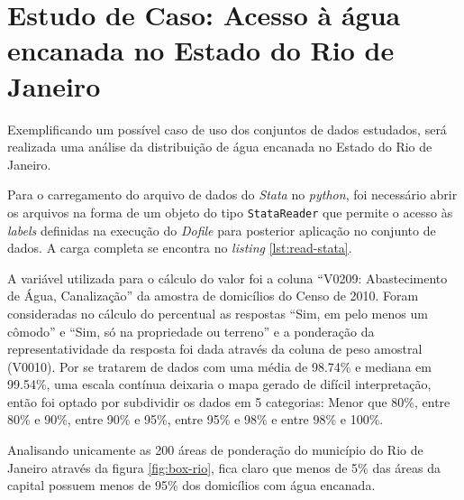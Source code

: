 

\chapter{Estudo de Caso: Acesso à água encanada no Estado do Rio de Janeiro}

    Exemplificando um possível caso de uso dos conjuntos de dados estudados, será realizada uma análise da distribuição de água encanada no Estado do Rio de Janeiro.

    Para o carregamento do arquivo de dados do \textit{Stata} no \textit{python}, foi necessário abrir os arquivos na forma de um objeto do tipo \verb|StataReader| que permite o acesso às \textit{labels} definidas na execução do \textit{Dofile} para posterior aplicação no conjunto de dados. A carga completa se encontra no \textit{listing} \ref{lst:read-stata}. 
    
    A variável utilizada para o cálculo do valor foi a coluna ``V0209: Abastecimento de Água, Canalização'' da amostra de domicílios do Censo de 2010. Foram consideradas no cálculo do percentual as respostas ``Sim, em pelo menos um cômodo'' e ``Sim, só na propriedade ou terreno'' e a ponderação da representatividade da resposta foi dada através da coluna de peso amostral (V0010). Por se tratarem de dados com uma média de 98.74\% e mediana em 99.54\%, uma escala contínua deixaria o mapa gerado de difícil interpretação, então foi optado por subdividir os dados em 5 categorias: Menor que 80\%, entre 80\% e 90\%, entre 90\% e 95\%, entre 95\% e 98\% e entre 98\% e 100\%.

    Analisando unicamente as 200 áreas de ponderação do município do Rio de Janeiro através da figura \ref{fig:box-rio}, fica claro que menos de 5\% das áreas da capital possuem menos de 95\% dos domicílios com água encanada.

